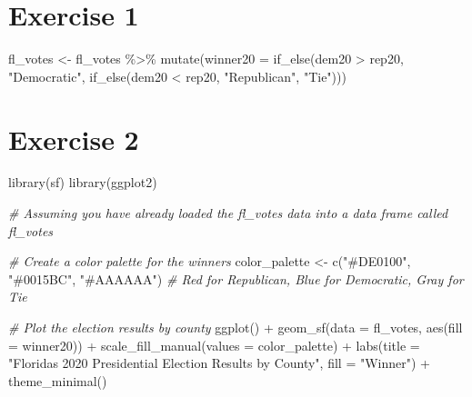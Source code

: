 \documentclass[
]{article}
\newenvironment{Shaded}{\begin{snugshade}}{\end{snugshade}}
\newcommand{\AttributeTok}[1]{\textcolor[rgb]{0.77,0.63,0.00}{#1}}
\newcommand{\CommentTok}[1]{\textcolor[rgb]{0.56,0.35,0.01}{\textit{#1}}}
\newcommand{\FunctionTok}[1]{\textcolor[rgb]{0.00,0.00,0.00}{#1}}
\newcommand{\NormalTok}[1]{#1}
\newcommand{\OtherTok}[1]{\textcolor[rgb]{0.56,0.35,0.01}{#1}}
\newcommand{\SpecialCharTok}[1]{\textcolor[rgb]{0.00,0.00,0.00}{#1}}
\newcommand{\StringTok}[1]{\textcolor[rgb]{0.31,0.60,0.02}{#1}}
\begin{document}
\hypertarget{exercise-1}{%
\section{Exercise 1}\label{exercise-1}}

\begin{Shaded}
\begin{Highlighting}[]
\NormalTok{fl\_votes }\OtherTok{\textless{}{-}}\NormalTok{ fl\_votes }\SpecialCharTok{\%\textgreater{}\%}
  \FunctionTok{mutate}\NormalTok{(}\AttributeTok{winner20 =} \FunctionTok{if\_else}\NormalTok{(dem20 }\SpecialCharTok{\textgreater{}}\NormalTok{ rep20, }\StringTok{"Democratic"}\NormalTok{, }
                            \FunctionTok{if\_else}\NormalTok{(dem20 }\SpecialCharTok{\textless{}}\NormalTok{ rep20, }\StringTok{"Republican"}\NormalTok{, }\StringTok{"Tie"}\NormalTok{)))}
\end{Highlighting}
\end{Shaded}

\hypertarget{exercise-2}{%
\section{Exercise 2}\label{exercise-2}}

\begin{Shaded}
\begin{Highlighting}[]
\FunctionTok{library}\NormalTok{(sf)}
\FunctionTok{library}\NormalTok{(ggplot2)}

\CommentTok{\# Assuming you have already loaded the fl\_votes data into a data frame called \textquotesingle{}fl\_votes\textquotesingle{}}

\CommentTok{\# Create a color palette for the winners}
\NormalTok{color\_palette }\OtherTok{\textless{}{-}} \FunctionTok{c}\NormalTok{(}\StringTok{"\#DE0100"}\NormalTok{, }\StringTok{"\#0015BC"}\NormalTok{, }\StringTok{"\#AAAAAA"}\NormalTok{) }\CommentTok{\# Red for Republican, Blue for Democratic, Gray for Tie}

\CommentTok{\# Plot the election results by county}
\FunctionTok{ggplot}\NormalTok{() }\SpecialCharTok{+}
  \FunctionTok{geom\_sf}\NormalTok{(}\AttributeTok{data =}\NormalTok{ fl\_votes, }\FunctionTok{aes}\NormalTok{(}\AttributeTok{fill =}\NormalTok{ winner20)) }\SpecialCharTok{+}
  \FunctionTok{scale\_fill\_manual}\NormalTok{(}\AttributeTok{values =}\NormalTok{ color\_palette) }\SpecialCharTok{+}
  \FunctionTok{labs}\NormalTok{(}\AttributeTok{title =} \StringTok{"Florida\textquotesingle{}s 2020 Presidential Election Results by County"}\NormalTok{,}
       \AttributeTok{fill =} \StringTok{"Winner"}\NormalTok{) }\SpecialCharTok{+}
  \FunctionTok{theme\_minimal}\NormalTok{()}
\end{Highlighting}
\end{Shaded}
\end{document}
